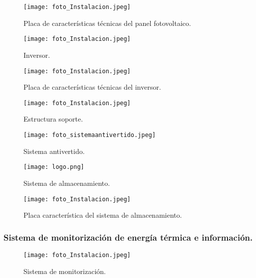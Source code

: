 \documentclass{article}
\begin{document}
\begin{figure}[h]
    \caption{Placa de características técnicas del panel fotovoltaico.}
    \centering
    \texttt{[image: foto\_Instalacion.jpeg]}
\end{figure}

\begin{figure}[h]
    \caption{Inversor.}
    \centering
    \texttt{[image: foto\_Instalacion.jpeg]}
\end{figure}

\begin{figure}[h]
    \caption{Placa de características técnicas del inversor.}
    \centering
    \texttt{[image: foto\_Instalacion.jpeg]}
\end{figure}

\begin{figure}[h]
    \caption{Estructura soporte.}
    \centering
    \texttt{[image: foto\_Instalacion.jpeg]}
\end{figure}

\begin{figure}[h]
    \caption{Sistema antivertido.}
    \centering
    \texttt{[image: foto\_sistemaantivertido.jpeg]}
\end{figure}

\begin{figure}[h]
    \caption{Sistema de almacenamiento.}
    \centering
    \texttt{[image: logo.png]}
\end{figure}

\begin{figure}[h]
    \caption{Placa característica del sistema de almacenamiento.}
    \centering
    \texttt{[image: foto\_Instalacion.jpeg]}
\end{figure}



\subsubsection{Sistema de monitorización de energía térmica e información.}

\begin{figure}[h]
    \caption{Sistema de monitorización.}
    \centering
    \texttt{[image: foto\_Instalacion.jpeg]}
\end{figure}
\end{document}

